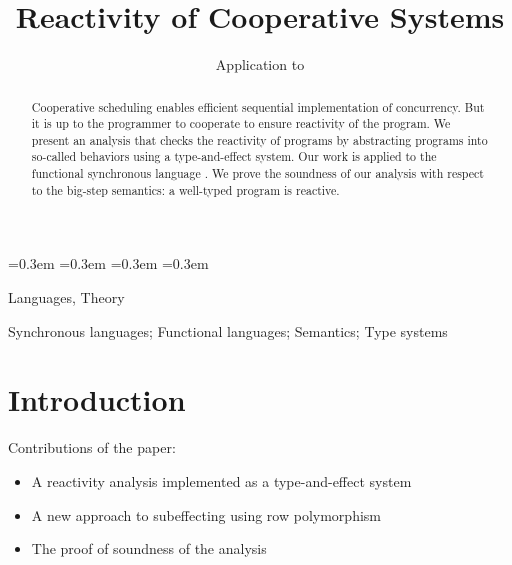 \documentclass[9pt,preprint]{sigplanconf}
\begin{document}
\abovedisplayshortskip=0.3em
\belowdisplayshortskip=0.3em
\abovedisplayskip=0.3em
\belowdisplayskip=0.3em

\newtheorem{theorem}{Theorem}[section]
\newtheorem{property}{Property}
\newtheorem{definition}{Definition}
\newtheorem{lemma}{Lemma}

\title{Reactivity of Cooperative Systems}
\subtitle{Application to \rml}

\authorinfo{}{}{}

\maketitle

\begin{abstract}
Cooperative scheduling enables efficient sequential implementation of concurrency. But it is up to the programmer to cooperate to ensure reactivity of the program. We present an analysis that checks the reactivity of programs by abstracting programs into so-called behaviors using a type-and-effect system. Our work is applied to the functional synchronous language \rml. We prove the soundness of our analysis with respect to the big-step semantics: a well-typed program is reactive.
\end{abstract}


\terms
Languages, Theory

\keywords
Synchronous languages; Functional languages;  Semantics; Type systems

\section{Introduction}
\label{sec:introduction}

Contributions of the paper:
\begin{itemize}
\item A reactivity analysis implemented as a type-and-effect system
\item A new approach to subeffecting using row polymorphism
\item The proof of soundness of the analysis
\end{itemize}
\end{document}
